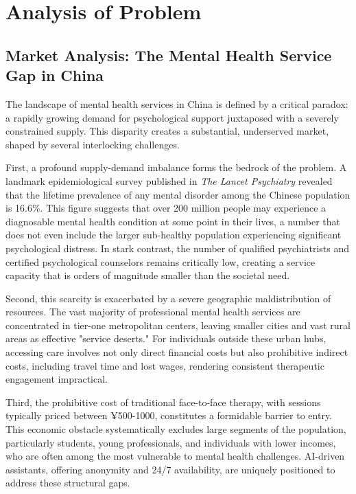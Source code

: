 \section{Analysis of Problem}
\label{sec:problem_analysis}

\subsection{Market Analysis: The Mental Health Service Gap in China}

The landscape of mental health services in China is defined by a critical paradox: a rapidly growing demand for psychological support juxtaposed with a severely constrained supply. This disparity creates a substantial, underserved market, shaped by several interlocking challenges.

First, a profound supply-demand imbalance forms the bedrock of the problem. A landmark epidemiological survey published in \textit{The Lancet Psychiatry} revealed that the lifetime prevalence of any mental disorder among the Chinese population is 16.6\%. This figure suggests that over 200 million people may experience a diagnosable mental health condition at some point in their lives, a number that does not even include the larger sub-healthy population experiencing significant psychological distress. In stark contrast, the number of qualified psychiatrists and certified psychological counselors remains critically low, creating a service capacity that is orders of magnitude smaller than the societal need.

Second, this scarcity is exacerbated by a severe geographic maldistribution of resources. The vast majority of professional mental health services are concentrated in tier-one metropolitan centers, leaving smaller cities and vast rural areas as effective "service deserts." For individuals outside these urban hubs, accessing care involves not only direct financial costs but also prohibitive indirect costs, including travel time and lost wages, rendering consistent therapeutic engagement impractical.

Third, the prohibitive cost of traditional face-to-face therapy, with sessions typically priced between ¥500-1000, constitutes a formidable barrier to entry. This economic obstacle systematically excludes large segments of the population, particularly students, young professionals, and individuals with lower incomes, who are often among the most vulnerable to mental health challenges. AI-driven assistants, offering anonymity and 24/7 availability, are uniquely positioned to address these structural gaps.

